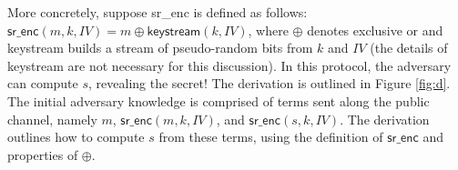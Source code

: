 \documentclass{article}
\theoremstyle{definition}
\begin{document}
More concretely, suppose \textsf{sr\_enc} is defined as follows: 
$\textsf{sr\_enc}(m, k, \textit{IV}) = m \oplus \textsf{keystream}(k, \textit{IV})$, 
where $\oplus$ denotes exclusive or and \textsf{keystream} builds a stream of pseudo-random bits 
from $k$ and $\textit{IV}$ (the details of \textsf{keystream} are not necessary for this discussion). 
In this protocol, the adversary can compute $s$, revealing the secret! 
The derivation is outlined in Figure \ref{fig:d}. 
The initial adversary knowledge is comprised of terms sent along the public channel, 
namely $m$, $\mathsf{sr\_enc}(m, k, \mathit{IV})$, and $\mathsf{sr\_enc}(s, k, \mathit{IV})$.
The derivation outlines how to compute $s$ from these terms, using the definition of 
$\mathsf{sr\_enc}$ and properties of $\oplus$.

\end{document}
